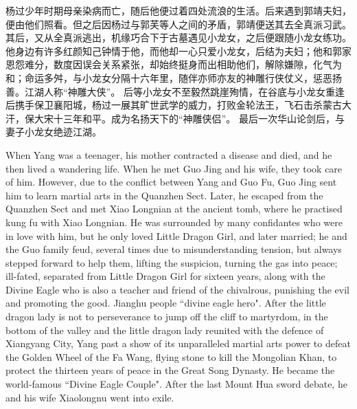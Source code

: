 \documentclass[print, doctor, vlined]{DissertUESTC}
\begin{document}
	
	\zhabstract
	
	杨过少年时期母亲染病而亡，随后他便过着四处流浪的生活。后来遇到郭靖夫妇，便由他们照看。但之后因杨过与郭芙等人之间的矛盾，郭靖便送其去全真派习武。其后，又从全真派逃出，机缘巧合下于古墓遇见小龙女，之后便跟随小龙女练功。 他身边有许多红颜知己钟情于他，而他却一心只爱小龙女，后结为夫妇；他和郭家恩怨难分，数度因误会关系紧张，却始终挺身而出相助他们，解除嫌隙，化气为和；命运多舛，与小龙女分隔十六年里，随伴亦师亦友的神雕行侠仗义，惩恶扬善。江湖人称“神雕大侠”。 后等小龙女不至毅然跳崖殉情，在谷底与小龙女重逢后携手保卫襄阳城，杨过一展其旷世武学的威力，打败金轮法王，飞石击杀蒙古大汗，保大宋十三年和平。成为名扬天下的“神雕侠侣”。 最后一次华山论剑后，与妻子小龙女绝迹江湖。
	
	
	
	\enabstract
	
	When Yang was a teenager, his mother contracted a disease and died, and he then lived a wandering life. When he met Guo Jing and his wife, they took care of him. However, due to the conflict between Yang and Guo Fu, Guo Jing sent him to learn martial arts in the Quanzhen Sect. Later, he escaped from the Quanzhen Sect and met Xiao Longnian at the ancient tomb, where he practised kung fu with Xiao Longnian. He was surrounded by many confidantes who were in love with him, but he only loved Little Dragon Girl, and later married; he and the Guo family feud, several times due to misunderstanding tension, but always stepped forward to help them, lifting the suspicion, turning the gas into peace; ill-fated, separated from Little Dragon Girl for sixteen years, along with the Divine Eagle who is also a teacher and friend of the chivalrous, punishing the evil and promoting the good. Jianghu people ``divine eagle hero". After the little dragon lady is not to perseverance to jump off the cliff to martyrdom, in the bottom of the valley and the little dragon lady reunited with the defence of Xiangyang City, Yang past a show of its unparalleled martial arts power to defeat the Golden Wheel of the Fa Wang, flying stone to kill the Mongolian Khan, to protect the thirteen years of peace in the Great Song Dynasty. He became the world-famous ``Divine Eagle Couple". After the last Mount Hua sword debate, he and his wife Xiaolongnu went into exile.
	
\end{document}
